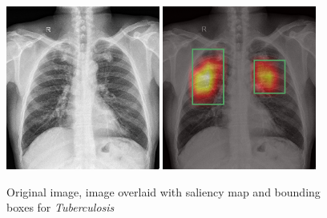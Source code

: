 \documentclass[8pt]{beamer}
\begin{document}
\begin{frame}
\begin{figure}[H]
  \centering
  \includegraphics[width=0.45\textwidth]{images/preds/TB2}\hspace{0.01\textwidth}%
  \includegraphics[width=0.45\textwidth]{images/preds/TB2_cam}\\[0.01\textwidth]
  \caption{Original image, image overlaid with saliency map and bounding boxes
    for \emph{Tuberculosis}}
  \label{examples_17}
\end{figure}
\end{frame}
\end{document}

